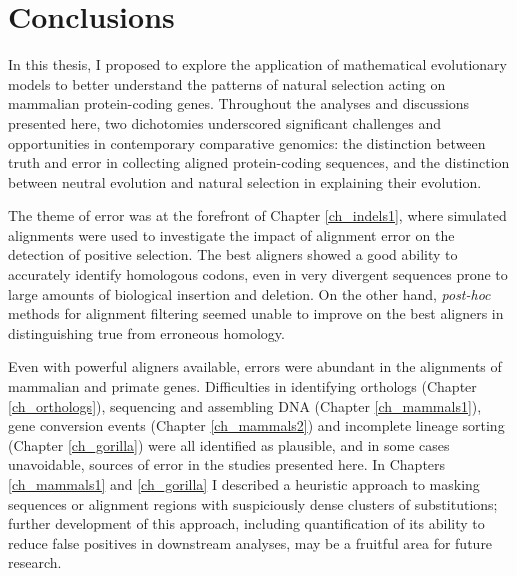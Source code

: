 \chapter{Conclusions}
\label{ch_conclusions}
\acresetall

In this thesis, I proposed to explore the application of mathematical
evolutionary models to better understand the patterns of natural
selection acting on mammalian protein-coding genes. Throughout the
analyses and discussions presented here, two dichotomies underscored
significant challenges and opportunities in contemporary comparative
genomics: the distinction between truth and error in collecting
aligned protein-coding sequences, and the distinction between neutral
evolution and natural selection in explaining their evolution.

The theme of error was at the forefront of Chapter \ref{ch_indels1},
where simulated alignments were used to investigate the impact of
alignment error on the detection of \sw positive selection. The best
aligners showed a good ability to accurately identify homologous
codons, even in very divergent sequences prone to large amounts of
biological insertion and deletion. On the other hand, \emph{post-hoc}
methods for alignment filtering seemed unable to improve on the best
aligners in distinguishing true from erroneous homology.

Even with powerful aligners available, errors were abundant in the
alignments of mammalian and primate genes. Difficulties in identifying
orthologs (Chapter \ref{ch_orthologs}), sequencing and assembling DNA
(Chapter \ref{ch_mammals1}), gene conversion events (Chapter
\ref{ch_mammals2}) and incomplete lineage sorting (Chapter
\ref{ch_gorilla}) were all identified as plausible, and in some cases
unavoidable, sources of error in the studies presented here. In
Chapters \ref{ch_mammals1} and \ref{ch_gorilla} I described a
heuristic approach to masking sequences or alignment regions with
suspiciously dense clusters of \nsyn substitutions; further
development of this approach, including quantification of its ability
to reduce false positives in downstream analyses, may be a fruitful
area for future research.

